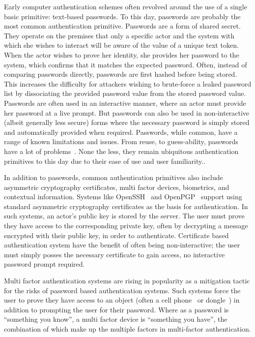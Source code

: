 Early computer authentication schemes often revolved around the use of
a single basic primitive: text-based passwords. To this day, passwords
are probably the most common authentication primitive. Passwords are a
form of shared secret. They operate on the premises that only a
specific actor and the system with which she wishes to interact will
be aware of the value of a unique text token. When the actor wishes to
prove her identity, she provides her password to the system, which
confirms that it matches the expected password. Often, instead of
comparing passwords directly, passwords are first hashed before being
stored. This increases the difficulty for attackers wishing to
brute-force a leaked password list by dissociating the provided
password value from the stored password value. Passwords are often
used in an interactive manner, where an actor must provide her
password at a live prompt. But passwords can also be used in
non-interactive (albeit generally less secure) forms where the
necessary password is simply stored and automatically provided when
required. Passwords, while common, have a range of known limitations
and issues. From reuse, to guess-ability, passwords have a lot of
problems~\cite{singer-passwords, goodin-passwords, goodin-bible}. None
the less, they remain ubiquitous authentication primitives to this day
due to their ease of use and user familiarity..

In addition to passwords, common authentication primitives also
include asymmetric cryptography certificates, multi factor devices,
biometrics, and contextual information. Systems like
OpenSSH~\cite{openSSH} and OpenPGP~\cite{openpgp} support using
standard asymmetric cryptography certificates as the basis for
authentication. In such systems, an actor's public key is stored by
the server. The user must prove they have access to the corresponding
private key, often by decrypting a message encrypted with their public
key, in order to authenticate. Certificate based authentication system
have the benefit of often being non-interactive; the user must simply
posses the necessary certificate to gain access, no interactive
password prompt required.

Multi factor authentication systems are rising in popularity as a
mitigation tactic for the risks of password based authentication
systems. Such systems force the user to prove they have access to an
object (often a cell phone~\cite{google-auth} or
dongle~\cite{yubikey}) in addition to prompting the user for their
password. Where as a password is ``something you know'', a multi
factor device is ``something you have'', the combination of which make
up the multiple factors in multi-factor authentication.

